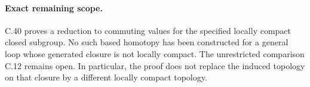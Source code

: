 \paragraph{Exact remaining scope.}
C.40 proves a reduction to commuting values for
the specified locally compact closed subgroup.
No such based homotopy has been constructed for
a general loop whose generated closure is not
locally compact. The unrestricted comparison
C.12 remains open. In particular, the proof
does not replace the induced topology on that
closure by a different locally compact topology.
